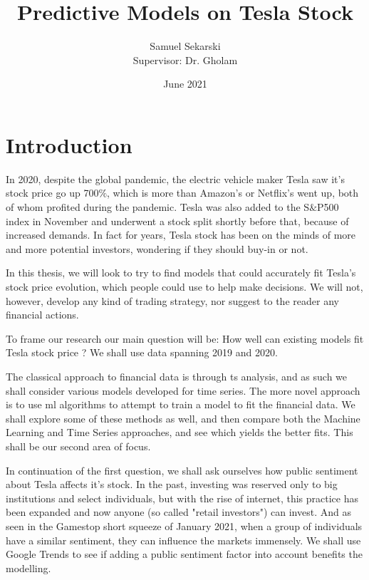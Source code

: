 \documentclass[10pt]{report}
\title{Predictive Models on Tesla Stock}
\author{Samuel Sekarski \\ Supervisor: Dr. Gholam}
\date{June 2021}
\begin{document}
 
\maketitle

\tableofcontents
\listoffigures

\chapter{Introduction}
In 2020, despite the global pandemic, the electric vehicle maker Tesla saw it's stock price go up 700$\%$, which is more than Amazon's or Netflix's went up, both of whom profited during the pandemic. Tesla was also added to the S$\&$P500 index in November and underwent a stock split shortly before that, because of increased demands. In fact for years, Tesla stock has been on the minds of more and more potential investors, wondering if they should buy-in or not.

In this thesis, we will look to try to find models that could accurately fit Tesla's stock price evolution, which people could use to help make decisions. We will not, however, develop any kind of trading strategy, nor suggest to the reader any financial actions.

To frame our research our main question will be: How well can existing models fit Tesla stock price ?
We shall use data spanning 2019 and 2020.

The classical approach to financial data is through \acrfull{ts} analysis, and as such we shall consider various models developed for time series. The more novel approach is to use \acrfull{ml} algorithms to attempt to train a model to fit the financial data. We shall explore some of these methods as well, and then compare both the Machine Learning and Time Series approaches, and see which yields the better fits. This shall be our second area of focus.

In continuation of the first question, we shall ask ourselves how public sentiment about Tesla affects it's stock. In the past, investing was reserved only to big institutions and select individuals, but with the rise of internet, this practice has been expanded and now anyone (so called "retail investors") can invest. And as seen in the Gamestop short squeeze of January 2021, when a group of individuals have a similar sentiment, they can influence the markets immensely. We shall use Google Trends to see if adding a public sentiment factor into account benefits the modelling.
\end{document}
